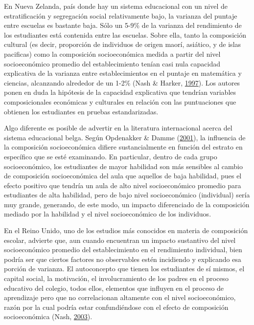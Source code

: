 \documentclass[
]{article}
\begin{document}
En Nueva Zelanda, país donde hay un sistema educacional con un nivel de
estratificación y segregación social relativamente bajo, la varianza del
puntaje entre escuelas es bastante baja. Sólo un 5-9\% de la varianza
del rendimiento de los estudiantes está contenida entre las escuelas.
Sobre ella, tanto la composición cultural (es decir, proporción de
individuos de origen maorí, asiático, y de islas pacificas) como la
composición socioeconómica medida a partir del nivel socioeconómico
promedio del establecimiento tenían casi nula capacidad explicativa de
la varianza entre establecimientos en el puntaje en matemática y
ciencias, alcanzando alrededor de un 1-2\% (Nash \& Harker,
\protect\hyperlink{ref-nash_progress_1997}{1997}). Los autores ponen en
duda la hipótesis de la capacidad explicativa que tendrían variables
composicionales económicas y culturales en relación con las puntuaciones
que obtienen los estudiantes en pruebas estandarizadas.

Algo diferente es posible de advertir en la literatura internacional
acerca del sistema educacional belga. Según Opdenakker \& Damme
(\protect\hyperlink{ref-opdenakker_relationship_2001}{2001}), la
influencia de la composición socioeconómica difiere sustancialmente en
función del estrato en específico que se esté examinando. En particular,
dentro de cada grupo socioeconómico, los estudiantes de mayor habilidad
son más sensibles al cambio de composición socioeconómica del aula que
aquellos de baja habilidad, pues el efecto positivo que tendría un aula
de alto nivel socioeconómico promedio para estudiantes de alta
habilidad, pero de bajo nivel socioeconómico (individual) sería muy
grande, generando, de este modo, un impacto diferenciado de la
composición mediado por la habilidad y el nivel socioeconómico de los
individuos.

En el Reino Unido, uno de los estudios más conocidos en materia de
composición escolar, advierte que, aun cuando encuentran un impacto
sustantivo del nivel socioeconómico promedio del establecimiento en el
rendimiento individual, bien podría ser que ciertos factores no
observables estén incidiendo y explicando esa porción de varianza. El
autoconcepto que tienen los estudiantes de sí mismos, el capital social,
la motivación, el involucramiento de los padres en el proceso educativo
del colegio, todos ellos, elementos que influyen en el proceso de
aprendizaje pero que no correlacionan altamente con el nivel
socioeconómico, razón por la cual podría estar confundiéndose con el
efecto de composición socioeconómica (Nash,
\protect\hyperlink{ref-nash_school_2003}{2003}).
\end{document}
